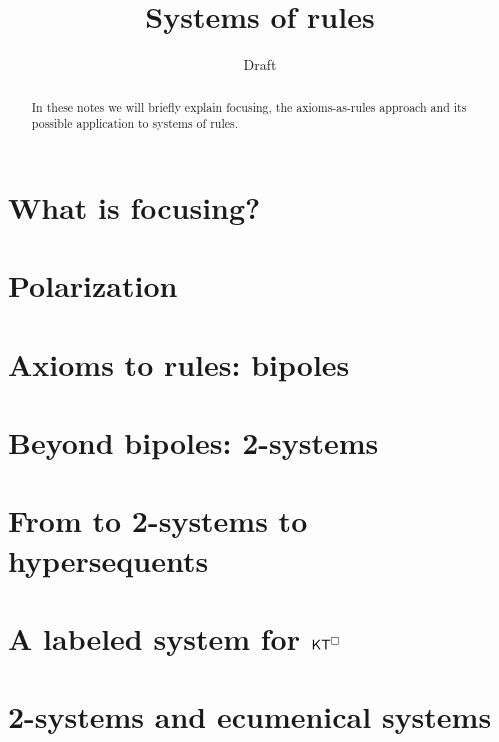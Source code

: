 \documentclass{llncs}
\title{Systems of rules}
\author{Draft}
\institute{\today}
\begin{document}
\maketitle

\begin{abstract}
In these notes we will briefly explain focusing, the axioms-as-rules
approach and its possible application to systems of rules. 
\end{abstract}


\section{What is focusing?}\label{sec:intro}



\section{Polarization}\label{sec:polarization}


\section{Axioms to rules: bipoles}\label{sec:bipol}


\section{Beyond bipoles: 2-systems}


\section{From to 2-systems to hypersequents}


\section{A labeled system for $\mathsf{K}\mathsf{T}^\Box$}


\section{2-systems and ecumenical systems}\label{sec:ec}



\end{document}
